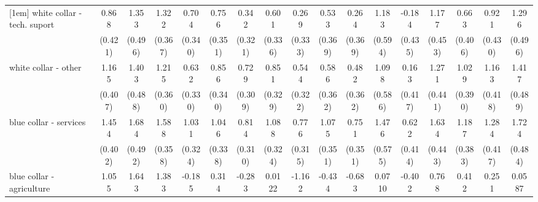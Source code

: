 {\begin{tabular}{l*{16}{c}}
[1em]
white collar - tech. suport&       0.868\sym{*}  &       1.353\sym{**} &       1.322\sym{***}&       0.704\sym{*}  &       0.756\sym{*}  &       0.342         &       0.601         &       0.269         &       0.533         &       0.264         &       1.183\sym{*}  &      -0.184         &       1.177\sym{**} &       0.663         &       0.921\sym{*}  &       1.296\sym{**} \\
                    &     (0.421)         &     (0.496)         &     (0.367)         &     (0.340)         &     (0.351)         &     (0.321)         &     (0.336)         &     (0.333)         &     (0.369)         &     (0.369)         &     (0.594)         &     (0.435)         &     (0.453)         &     (0.406)         &     (0.430)         &     (0.496)         \\
[1em]
white collar - other&       1.165\sym{**} &       1.403\sym{**} &       1.215\sym{***}&       0.632         &       0.856\sym{*}  &       0.729\sym{*}  &       0.851\sym{**} &       0.544         &       0.586         &       0.482         &       1.098         &       0.163         &       1.271\sym{**} &       1.029\sym{**} &       1.163\sym{**} &       1.417\sym{**} \\
                    &     (0.407)         &     (0.488)         &     (0.360)         &     (0.330)         &     (0.340)         &     (0.309)         &     (0.329)         &     (0.322)         &     (0.362)         &     (0.362)         &     (0.586)         &     (0.417)         &     (0.441)         &     (0.390)         &     (0.418)         &     (0.489)         \\
[1em]
blue collar - services&       1.454\sym{***}&       1.684\sym{***}&       1.588\sym{***}&       1.031\sym{**} &       1.046\sym{**} &       0.814\sym{**} &       1.088\sym{***}&       0.776\sym{*}  &       1.075\sym{**} &       0.751\sym{*}  &       1.476\sym{*}  &       0.622         &       1.634\sym{***}&       1.187\sym{**} &       1.284\sym{**} &       1.724\sym{***}\\
                    &     (0.402)         &     (0.492)         &     (0.358)         &     (0.324)         &     (0.338)         &     (0.310)         &     (0.324)         &     (0.315)         &     (0.351)         &     (0.351)         &     (0.575)         &     (0.414)         &     (0.443)         &     (0.383)         &     (0.417)         &     (0.484)         \\
[1em]
blue collar - agriculture&       1.055\sym{*}  &       1.643\sym{**} &       1.383\sym{**} &      -0.185         &       0.314         &      -0.283         &      0.0122         &      -1.162         &      -0.434         &      -0.683         &      0.0710         &      -0.402         &       0.768         &       0.412         &       0.251         &      0.0587         \\

\end{tabular}}
